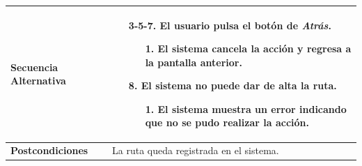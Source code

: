 \begin{longtable}{| p{4cm} | p{10cm} |}
\hline
\textbf{Secuencia Alternativa} &\mbox{}\par\vspace{-\baselineskip}
\begin{enumerate}[leftmargin=1.2cm, topsep=0.1cm]
\item[3-5-7.] El usuario pulsa el botón de \textit{Atrás}.
	\begin{itemize}
	\item[1.] El sistema cancela la acción y regresa a la pantalla anterior.
	\end{itemize}
\item[8.] El sistema no puede dar de alta la ruta.
	\begin{itemize}
	\item[1.] El sistema muestra un error indicando que no se pudo realizar la acción.
	\end{itemize}
\end{enumerate}


\\

\hline
\textbf{Postcondiciones} & 
La ruta queda registrada en el sistema.\\
\hline
\end{longtable}




\newpage
